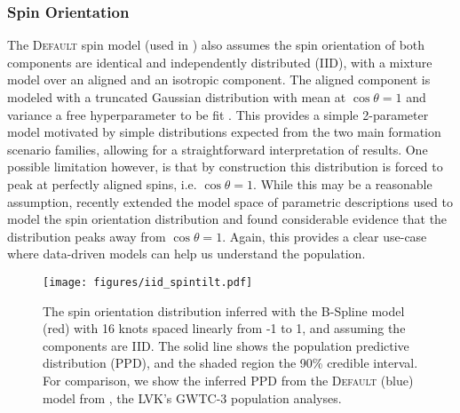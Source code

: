 \subsubsection{Spin Orientation}

The \textsc{Default} spin model (used in \citet{o3a_pop, o3b_astro_dist}) also assumes the spin orientation of both components are identical and independently distributed (IID), with a mixture model over an
aligned and an isotropic component. The aligned component is modeled with a truncated Gaussian distribution with mean at $\cos{\theta}=1$ and variance a free 
hyperparameter to be fit \citep{Talbot_2017,Wysocki_2019,o3a_pop,o3b_astro_dist}. This provides a simple 2-parameter model motivated by simple distributions expected from the two main formation scenario families, allowing 
for a straightforward interpretation of results. One possible limitation however, is that by construction this distribution is forced to peak at perfectly aligned spins, 
i.e. $\cos{\theta}=1$. While this may be a reasonable assumption, \citet{spinitasyoulike} recently extended the model space of parametric descriptions 
used to model the spin orientation distribution and found considerable evidence that the distribution peaks away from $\cos{\theta}=1$. Again, this provides a clear 
use-case where data-driven models can help us understand the population.

\begin{figure}[ht!]
    \begin{centering}
        \texttt{[image: figures/iid\_spintilt.pdf]}
        \caption{The spin orientation distribution inferred with the B-Spline model (red) with 16 knots spaced linearly from -1 to 1, and assuming the components are IID. The solid line shows the population predictive distribution (PPD), and the shaded region the 90\% credible interval. 
        For comparison, we show the inferred PPD from the \textsc{Default} (blue) model from \citet{o3b_astro_dist}, the LVK's GWTC-3 population analyses.}
        \label{fig:iid_spintilt_dist}
    \end{centering}
\end{figure}

